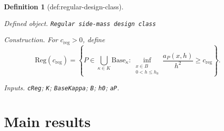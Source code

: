 \documentclass{article}
\newtheorem{definition}{Definition}
\begin{document}
\begin{definition}[def:regular-design-class]\label{def:regular-design-class}
\par\smallskip\noindent\emph{Defined object.} \texttt{Regular side-\allowbreak{}mass design class}
\par\smallskip\noindent\emph{Construction.} For \(c_{\mathrm{reg}}>0\), define
\[
 \mathrm{Reg}(c_{\mathrm{reg}})=
 \left\{P\in\bigcup_{\kappa\in K}\mathrm{Base}_\kappa:
 \inf_{\substack{x\in B\\0<h\leq h_0}}
 \frac{a_P(x,h)}{h^2}\geq c_{\mathrm{reg}}\right\}.
\]
\par\smallskip\noindent\emph{Inputs.} \texttt{cReg}; \texttt{K}; \texttt{BaseKappa}; \texttt{B}; \texttt{h0}; \texttt{aP}.
\end{definition}

\section{Main results}
\end{document}
